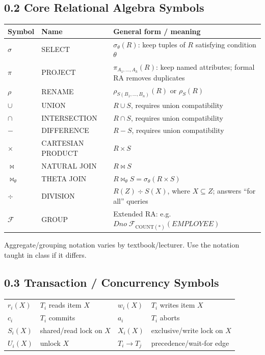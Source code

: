 \documentclass[10pt,a4paper]{article}
\begin{document}
\subsection{0.2 Core Relational Algebra Symbols}
\begin{center}
\begin{tabularx}{\textwidth}{>{\centering\arraybackslash}p{2.1cm} p{3cm} X}
\toprule
\textbf{Symbol} & \textbf{Name} & \textbf{General form / meaning}\\
\midrule
$\sigma$ & SELECT & $\sigma_{\theta}(R)$: keep tuples of $R$ satisfying condition $\theta$\\
$\pi$ & PROJECT & $\pi_{A_1,\ldots,A_k}(R)$: keep named attributes; formal RA removes duplicates\\
$\rho$ & RENAME & $\rho_{S(B_1,\ldots,B_n)}(R)$ or $\rho_S(R)$\\
$\cup$ & UNION & $R\cup S$, requires union compatibility\\
$\cap$ & INTERSECTION & $R\cap S$, requires union compatibility\\
$-$ & DIFFERENCE & $R-S$, requires union compatibility\\
$\times$ & CARTESIAN PRODUCT & $R\times S$\\
$\bowtie$ & NATURAL JOIN & $R\bowtie S$\\
$\bowtie_{\theta}$ & THETA JOIN & $R\bowtie_{\theta}S = \sigma_{\theta}(R\times S)$\\
$\div$ & DIVISION & $R(Z)\div S(X)$, where $X\subseteq Z$; answers ``for all'' queries\\
$\mathcal{F}$ & GROUP & Extended RA: e.g. $Dno\;\mathcal{F}_{\mathrm{COUNT}(*)}(EMPLOYEE)$\\
\bottomrule
\end{tabularx}
\end{center}
\footnotesize *Aggregate/grouping notation varies by textbook/lecturer. Use the notation taught in class if it differs.\normalsize

\subsection{0.3 Transaction / Concurrency Symbols}
\begin{center}
\begin{tabularx}{\textwidth}{p{2.3cm} X p{2.5cm} X}
\toprule
$r_i(X)$ & $T_i$ reads item $X$ & $w_i(X)$ & $T_i$ writes item $X$\\
$c_i$ & $T_i$ commits & $a_i$ & $T_i$ aborts\\
$S_i(X)$ & shared/read lock on $X$ & $X_i(X)$ & exclusive/write lock on $X$\\
$U_i(X)$ & unlock $X$ & $T_i\to T_j$ & precedence/wait-for edge\\
\bottomrule
\end{tabularx}
\end{center}
\end{document}
